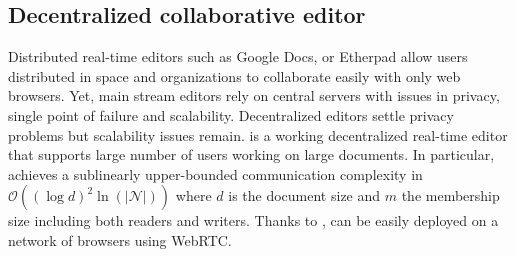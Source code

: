 
\subsection{Decentralized collaborative editor}
\label{subsec:editor}

Distributed real-time editors such as Google Docs, or Etherpad allow users
distributed in space and organizations to collaborate easily with only web
browsers. Yet, main stream editors rely on central servers with issues in
privacy, single point of failure and scalability.  Decentralized editors settle
privacy problems but scalability issues remain.  
\CRATE is a working decentralized real-time editor that supports large number of
users working on large documents. In particular, \CRATE achieves a sublinearly
upper-bounded communication complexity in
$\mathcal{O}((\log d)^2\ln(|\mathcal{N}|))$ where $d$ is the document size and
$m$ the membership size including both readers and writers. Thanks to \SPRAY,
\CRATE can be easily deployed on a network of browsers using WebRTC.



